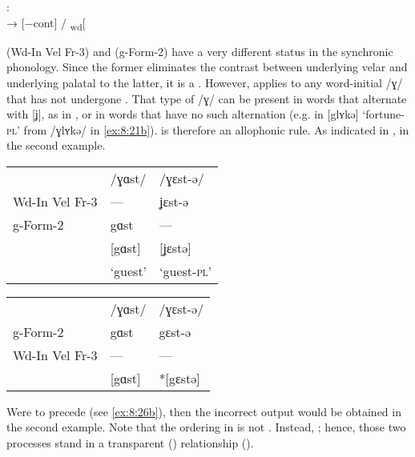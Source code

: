 \ea%
\label{ex:8:25}:\smallskip\\
  → [−cont] / \textsubscript{wd}[  {\longrule}
\z 

 (Wd-In Vel Fr-3) and  (g-Form-2) have a very different status in the synchronic phonology. Since the former eliminates the contrast between underlying velar and underlying palatal to the latter, it is a . However,  applies to any word-initial /ɣ/ that has not undergone . That type of /ɣ/ can be present in words that alternate with [ʝ], as in , or in words that have no such alternation (e.g. in [glʏkə] ‘fortune\textsc{{}-pl}’ from /ɣlʏkə/ in \ref{ex:8:21b}).   is therefore an allophonic rule. As indicated in ,    in the second example.

\ea%
\label{ex:8:26}
\ea\label{ex:8:26a} \begin{tabular}[t]{@{} lll @{}}
                 & /ɣɑst/ & /ɣɛst-ə/\\
  Wd-In Vel Fr-3 & --- &   ʝɛst-ə\\
  g-Form-2       & gɑst &  ---\\
                 & [gɑst]  &  [ʝɛstə]\\
                 & ‘guest’ & ‘guest-\textsc{pl}’\\
\end{tabular}
\ex\label{ex:8:26b} \begin{tabular}[t]{@{} lll @{}}
                 & /ɣɑst/ & /ɣɛst-ə/ \\
  g-Form-2       &  gɑst  & gɛst-ə   \\
  Wd-In Vel Fr-3 &  ---   &  ---     \\
                 & [gɑst] &  *[gɛstə]\\
\end{tabular}
\z 
\z 

Were  to precede  (see \ref{ex:8:26b}), then the incorrect output would be obtained in the second example. Note that the ordering in  is not . Instead,   ; hence, those two processes stand in a transparent () relationship ().

